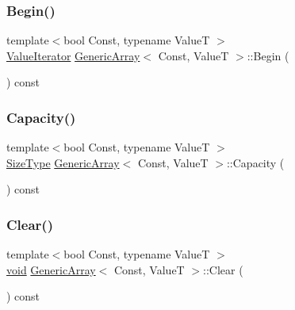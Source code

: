 \subsubsection{\texorpdfstring{Begin()}{Begin()}}
{\footnotesize\ttfamily template$<$bool Const, typename ValueT $>$ \\
\hyperlink{classGenericArray_afc6ad62c3f00531fa378db266182704a}{Value\+Iterator} \hyperlink{classGenericArray}{Generic\+Array}$<$ Const, ValueT $>$\+::Begin (\begin{DoxyParamCaption}{ }\end{DoxyParamCaption}) const\hspace{0.3cm}{\ttfamily [inline]}}

\mbox{\label{classGenericArray_ab385434ab7a99de7a0a17e5ee7e09d7f}} 
\subsubsection{\texorpdfstring{Capacity()}{Capacity()}}
{\footnotesize\ttfamily template$<$bool Const, typename ValueT $>$ \\
\hyperlink{rapidjson_8h_a5ed6e6e67250fadbd041127e6386dcb5}{Size\+Type} \hyperlink{classGenericArray}{Generic\+Array}$<$ Const, ValueT $>$\+::Capacity (\begin{DoxyParamCaption}{ }\end{DoxyParamCaption}) const\hspace{0.3cm}{\ttfamily [inline]}}

\mbox{\label{classGenericArray_a5e6c158ff76ab8a8ed568fa486e63c80}} 
\subsubsection{\texorpdfstring{Clear()}{Clear()}}
{\footnotesize\ttfamily template$<$bool Const, typename ValueT $>$ \\
\hyperlink{imgui__impl__opengl3__loader_8h_ac668e7cffd9e2e9cfee428b9b2f34fa7}{void} \hyperlink{classGenericArray}{Generic\+Array}$<$ Const, ValueT $>$\+::Clear (\begin{DoxyParamCaption}{ }\end{DoxyParamCaption}) const\hspace{0.3cm}{\ttfamily [inline]}}

